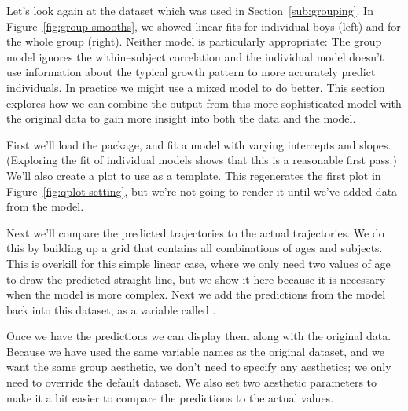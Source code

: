 Let's look again at the  dataset which was used in Section~\ref{sub:grouping}.  In Figure~\ref{fig:group-smooths}, we showed linear fits for individual boys (left) and for the whole group (right).  Neither model is particularly appropriate: The group model ignores the within--subject correlation and the individual model doesn't use information about the typical growth pattern to more accurately predict individuals.  In practice we might use a mixed model to do better.  This section explores how we can combine the output from this more sophisticated model with the original data to gain more insight into both the data and the model.

First we'll load the  package, and fit a model with varying intercepts and slopes.  (Exploring the fit of individual models shows that this is a reasonable first pass.)  We'll also create a plot to use as a template.  This regenerates the first plot in Figure~\ref{fig:qplot-setting}, but we're not going to render it until we've added data from the model.

% 


Next we'll compare the predicted trajectories to the actual trajectories.  We do this by building up a grid that contains all combinations of ages and subjects.  This is overkill for this simple linear case, where we only need two values of age to draw the predicted straight line, but we show it here because it is necessary when the model is more complex.  Next we add the predictions from the model back into this dataset, as a variable called .  

% 
% 


Once we have the predictions we can display them along with the original data.  Because we have used the same variable names as the original  dataset, and we want the same group aesthetic, we don't need to specify any aesthetics; we only need to override the default dataset.  We also set two aesthetic parameters to make it a bit easier to compare the predictions to the actual values.

